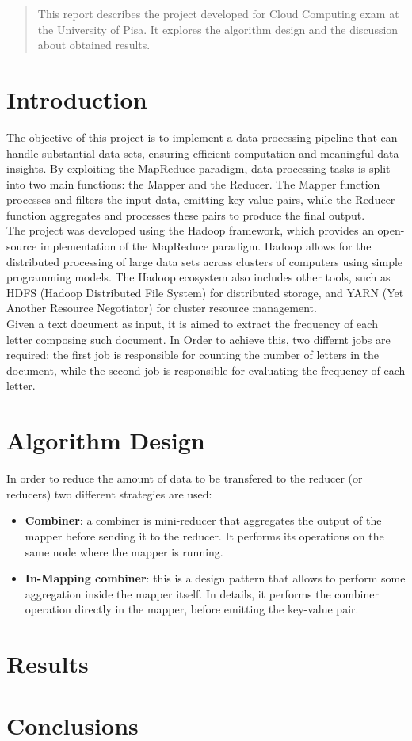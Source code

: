 \documentclass[a4paper, 12pt]{article}
\begin{document}


\tableofcontents
\newpage
\begin{abstract}

  \noindent This report describes the project developed for Cloud Computing exam at the University of Pisa. It explores the algorithm design and the discussion about obtained results.

\end{abstract}


\section{Introduction}

The objective of this project is to implement a data processing pipeline that can handle substantial data sets, ensuring efficient computation and meaningful data insights. By exploiting the MapReduce paradigm, data processing tasks is split into two main functions: the Mapper and the Reducer. The Mapper function processes and filters the input data, emitting key-value pairs, while the Reducer function aggregates and processes these pairs to produce the final output.\\
The project was developed using the Hadoop framework, which provides an open-source implementation of the MapReduce paradigm. Hadoop allows for the distributed processing of large data sets across clusters of computers using simple programming models. The Hadoop ecosystem also includes other tools, such as HDFS (Hadoop Distributed File System) for distributed storage, and YARN (Yet Another Resource Negotiator) for cluster resource management.\\

\noindent Given a text document as input, it is aimed to extract the frequency of each letter composing such document. In Order to achieve this, two differnt jobs are required: the first job is responsible for counting the number of letters in the document, while the second job is responsible for evaluating the frequency of each letter.\\





\section{Algorithm Design}
In order to reduce the amount of data to be transfered to the reducer (or reducers) two different strategies are used:
\begin{itemize}
  \item \textbf{Combiner}: a combiner is mini-reducer that aggregates the output of the mapper before sending it to the reducer. It performs its operations on the same node where the mapper is running.
  \item \textbf{In-Mapping combiner}: this is a design pattern that allows to perform some aggregation inside the mapper itself. In details, it performs the combiner operation directly in the mapper, before emitting the key-value pair.
\end{itemize}

\section{Results}


\section{Conclusions}
\end{document}
